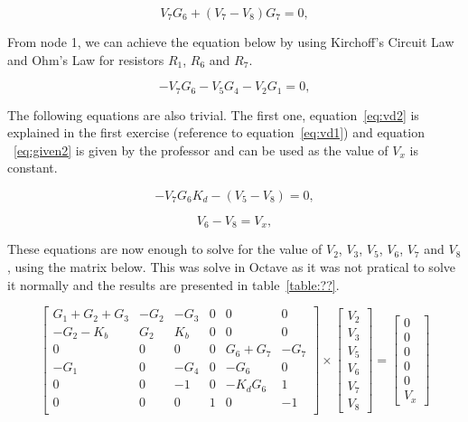 \begin{equation}
  V_{7}G_{6} + (V_{7} - V_{8})G_{7} = 0,
  \label{eq:node27}
\end{equation}

From node 1, we can achieve the equation below by using Kirchoff's Circuit Law and Ohm's Law for resistors $R_1$, $R_6$ and $R_7$.

\begin{equation}
  -V_{7}G_{6} - V_{5}G_{4} - V_{2}G_{1} = 0,
  \label{eq:node21}
\end{equation}


The following equations are also trivial. The first one, equation~\ref{eq:vd2} is explained in the first exercise (reference to equation~\ref{eq:vd1}) and equation ~\ref{eq:given2} is given by the professor and can be used as the value of $V_x$ is constant.

\begin{equation}
  -V_{7}G_{6}K_{d} - (V_{5} - V_{8}) = 0,
  \label{eq:vd2}
\end{equation}


\begin{equation}
  V_{6} - V_{8} = V_{x},
  \label{eq:given2}
\end{equation}

These equations are now enough to solve for the value of $V_2$, $V_3$, $V_5$, $V_6$, $V_7$ and $V_8$, using the matrix below. This was solve in Octave as it was not pratical to solve it normally and the results are presented in table~\ref{table:??}.

\begin{equation}
\left[ \begin{array}{cccccc} 
		G_1+G_2+G_3 & -G_2 & -G_3 & 0 & 0 & 0 \\
		-G_2-K_b & G_2 & K_b & 0 & 0 & 0 \\ 
		0 & 0 & 0 & 0 & G_6+G_7 & -G_7  \\ 
		-G_1 & 0 & -G_4 & 0 & -G_6 & 0  \\ 
		0 & 0 & -1 & 0 & -K_dG_6 & 1 \\ 
		0 & 0 & 0 & 1 & 0 & -1 \\ 
\end{array} \right]
\times \left[ \begin{array}{c} V_2 \\ V_3 \\  V_5 \\ V_6 \\ V_7 \\ V_8 \end{array} \right] =
\left[ \begin{array}{c} 0 \\ 0 \\ 0 \\ 0 \\ 0 \\ V_x  \end{array} \right]
\label{eq:nodalmatrix2}
\end{equation}

